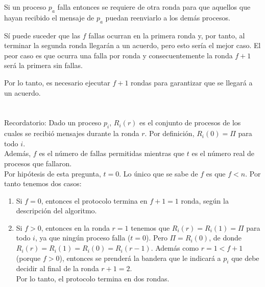 \documentclass{article}
\begin{document}
Si un proceso $p_a$ falla entonces se requiere de otra ronda para que aquellos que hayan recibido el mensaje de $p_a$ puedan reenviarlo a los demás procesos.

Sí puede suceder que las $f$ fallas ocurran en la primera ronda y, por tanto, al terminar la segunda ronda llegarán a un acuerdo, pero esto sería el mejor caso. El peor caso es que ocurra una falla por ronda y consecuentemente la ronda $f + 1$ será la primera sin fallas. 

Por lo tanto, es necesario ejecutar $f + 1$ rondas para garantizar que se llegará a un acuerdo.

\section{}

Recordatorio: Dado un proceso $p_i$, $R_i(r)$ es el conjunto de procesos de los cuales se recibió mensajes durante la ronda $r$. Por definición, $R_i(0) = \Pi$ para todo $i$. \\
Además, $f$ es el número de fallas permitidas mientras que $t$ es el número real de procesos que fallaron. \\

Por hipótesis de esta pregunta, $t = 0$. Lo único que se sabe de $f$ es que $f < n$. Por tanto tenemos dos casos:

\begin{enumerate}
    \item Si $f = 0$, entonces el protocolo termina en $f + 1 = 1$ ronda, según la descripción del algoritmo.
    \item Si $f > 0$, entonces en la ronda $r = 1$ tenemos que $R_i(r) = R_i(1) = \Pi$ para todo $i$, ya que ningún proceso falla ($t = 0$). Pero $\Pi = R_i(0)$, de donde $R_i(r) = R_i(1) = R_i(0) = R_i(r - 1)$. Además como $r = 1 < f + 1$ (porque $f > 0$), entonces se prenderá la bandera que le indicará a $p_i$ que debe decidir al final de la ronda $r + 1 = 2$. \\
    Por lo tanto, el protocolo termina en dos rondas.
\end{enumerate}
\end{document}
